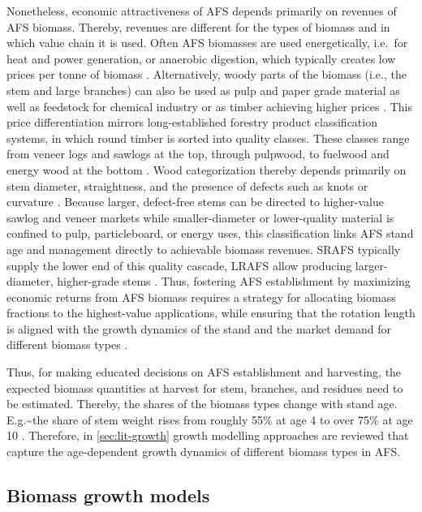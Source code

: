 \documentclass[APA,TimesLARGE]{WileyNJDv5} %
\begin{document}
Nonetheless, economic attractiveness of AFS depends primarily on revenues of AFS biomass. Thereby, revenues are different for the types of biomass and in which value chain it is used. Often AFS biomasses are used energetically, i.e.~for heat and power generation, or anaerobic digestion, which typically creates low prices per tonne of biomass \cite{keegan2013cascading}. Alternatively, woody parts of the biomass (i.e., the stem and large branches) can also be used as pulp and paper grade material as well as feedstock for chemical industry or as timber achieving higher prices \cite{Lamers2015_Feedstock_Design}. This price differentiation mirrors long-established forestry product classification systems, in which round timber is sorted into quality classes. These classes range from veneer logs and sawlogs at the top, through pulpwood, to fuelwood and energy wood at the bottom \cite{sandberg2023processcontrol}. Wood categorization thereby depends primarily on stem diameter, straightness, and the presence of defects such as knots or curvature \cite{petras2008assortment}. Because larger, defect-free stems can be directed to higher-value sawlog and veneer markets while smaller-diameter or lower-quality material is confined to pulp, particleboard, or energy uses, this classification links AFS stand age and management directly to achievable biomass revenues. SRAFS typically supply the lower end of this quality cascade, LRAFS allow producing larger-diameter, higher-grade stems \cite{skog2014woodenergy}. Thus, fostering AFS establishment by maximizing economic returns from AFS biomass requires a strategy for allocating biomass fractions to the highest-value applications, while ensuring that the rotation length is aligned with the growth dynamics of the stand and the market demand for different biomass types \cite{Lamers2015_Feedstock_Design}.

Thus, for making educated decisions on AFS establishment and harvesting, the expected biomass quantities at harvest for stem, branches, and residues need to be estimated. Thereby, the shares of the biomass types change with stand age. E.g.\textasciitilde the share of stem weight rises from roughly 55\% at age 4 to over 75\% at age 10 \cite{Huber2018_SRAFS_growth,Testa2014_Poplar_Economics}. Therefore, in \autoref{sec:lit-growth} growth modelling approaches are reviewed that capture the age-dependent growth dynamics of different biomass types in AFS.

\subsection{Biomass growth models}\label{sec:lit-growth}
\end{document}
